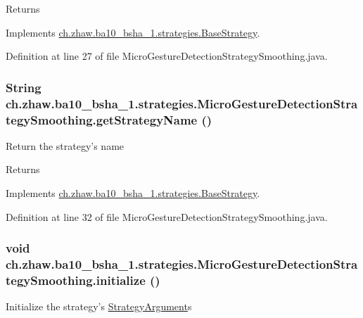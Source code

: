 \begin{DoxyReturn}{Returns}

\end{DoxyReturn}


Implements \hyperlink{classch_1_1zhaw_1_1ba10__bsha__1_1_1strategies_1_1BaseStrategy_a75fdb36932ad701f6375cc1fe718056b}{ch.zhaw.ba10\_\-bsha\_\-1.strategies.BaseStrategy}.

Definition at line 27 of file MicroGestureDetectionStrategySmoothing.java.\hypertarget{classch_1_1zhaw_1_1ba10__bsha__1_1_1strategies_1_1MicroGestureDetectionStrategySmoothing_aa12378131b9c311f0191934885c3345a}{
\subsubsection[{getStrategyName}]{\setlength{\rightskip}{0pt plus 5cm}String ch.zhaw.ba10\_\-bsha\_\-1.strategies.MicroGestureDetectionStrategySmoothing.getStrategyName ()}}
\label{classch_1_1zhaw_1_1ba10__bsha__1_1_1strategies_1_1MicroGestureDetectionStrategySmoothing_aa12378131b9c311f0191934885c3345a}
Return the strategy's name

\begin{DoxyReturn}{Returns}

\end{DoxyReturn}


Implements \hyperlink{classch_1_1zhaw_1_1ba10__bsha__1_1_1strategies_1_1BaseStrategy_aa0ebed55eed45409bad13d43a0058780}{ch.zhaw.ba10\_\-bsha\_\-1.strategies.BaseStrategy}.

Definition at line 32 of file MicroGestureDetectionStrategySmoothing.java.\hypertarget{classch_1_1zhaw_1_1ba10__bsha__1_1_1strategies_1_1MicroGestureDetectionStrategySmoothing_aac1ded82cadaac7e6f16e20a7db04190}{
\subsubsection[{initialize}]{\setlength{\rightskip}{0pt plus 5cm}void ch.zhaw.ba10\_\-bsha\_\-1.strategies.MicroGestureDetectionStrategySmoothing.initialize ()}}
\label{classch_1_1zhaw_1_1ba10__bsha__1_1_1strategies_1_1MicroGestureDetectionStrategySmoothing_aac1ded82cadaac7e6f16e20a7db04190}
Initialize the strategy's \hyperlink{classch_1_1zhaw_1_1ba10__bsha__1_1_1StrategyArgument}{StrategyArgument}s 

